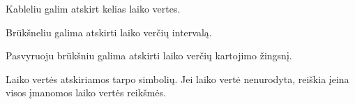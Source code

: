 \documentclass[letterpaper,10pt,lithuanian]{sphinxmanual}
\begin{document}
\begin{fulllineitems}
\begin{fulllineitems}
\begin{description}
\end{description}
\begin{description}
\sphinxlineitem{,}
\sphinxAtStartPar
Kableliu galim atskirt kelias laiko vertes.

\sphinxlineitem{\sphinxhyphen{}}
\sphinxAtStartPar
Brūkšneliu galima atskirti laiko verčių intervalą.

\end{description}
\begin{description}
\sphinxlineitem{/}
\sphinxAtStartPar
Pasvyruoju brūkšniu galima atskirti laiko verčių kartojimo
žingsnį.

\end{description}

\sphinxAtStartPar
Laiko vertės atskiriamos tarpo simbolių. Jei laiko vertė nenurodyta,
reiškia įeina visos įmanomos laiko vertės reikšmės.

\end{fulllineitems}


\begin{fulllineitems}
\label{\detokenize{formules:func.hourly}}
\pysigstartsignatures
{}
\pysigstopsignatures
\sphinxAtStartPar
{\hyperref[\detokenize{formules:func.cron}]{}}

\end{fulllineitems}


\begin{fulllineitems}
\label{\detokenize{formules:func.daily}}
\pysigstartsignatures
{}
\pysigstopsignatures
\sphinxAtStartPar
{\hyperref[\detokenize{formules:func.cron}]{}}

\end{fulllineitems}


\begin{fulllineitems}
\label{\detokenize{formules:func.weekly}}
\pysigstartsignatures
{}
\pysigstopsignatures
\sphinxAtStartPar
{\hyperref[\detokenize{formules:func.cron}]{}}


\end{fulllineitems}
\end{fulllineitems}
\end{document}
